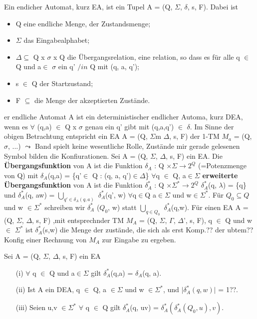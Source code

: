 Ein endicher Automat, kurz EA, ist ein Tupel A = (Q, $\Sigma$, $\delta$, s, F). Dabei ist 
\begin{itemize}
    \item Q eine endliche Menge, der Zustandsmenge;
    \item $\Sigma$ das Eingabealphabet;
    \item $\Delta \subseteq$ Q x $\sigma$ x Q die Übergangsrelation, eine relation, so dass es für alle q $\in$ Q und a$\in$ $\sigma$ ein q' $/in$ Q mit (q, a, q');
    \item s $\in$ Q der Startzustand;
    \item F $\subseteq$ die Menge der akzeptierten Zustände.
\end{itemize}
er endliche Automat A ist ein deterministischer endlicher Automa,
kurz DEA, wenn es $\forall$ (q,a) $\in$ Q x $\sigma$ genau ein q' gibt mit (q,a,q') $\in$ $\delta$. 
Im Sinne der obigen Betrachtung entspricht ein EA A = (Q, $\Sigma$m $\Delta$, s, F) der 1-TM $M_{a}$ = (Q, $\sigma$, ...)
$\leadsto $ Band spielt keine wesentliche Rolle, Zustände mir gerade gelesenen Symbol bilden die Konfiurationen.
Sei A = (Q, $\Sigma$, $\Delta$, s, F) ein EA. Die \textbf{Übergangsfunktion} von A ist die Funktion $\delta_{A}$ : Q $\times \Sigma\rightarrow 2^{Q}$ (=Potenzmenge von Q) mit $\delta_{A}$(q,a) = \{q'$\in$ Q : (q, a, q')$\in \Delta$\} $\forall$q $\in$ Q, a$\in \Sigma$ \textbf{erweiterte Übergangsfunktion} von A ist die Funktion $\delta_{A}^{*}$ : Q $\times \Sigma^{*} \rightarrow 2^{Q}$ $\delta_{A}^{*}$(q, $\lambda$) = \{q\} und $\delta_{A}^{*}$(q, aw) = $\bigcup \limits_{q'\in \delta_{A}(q,a)}$ $\delta_{A}^{*}$(q', w) $\forall$q$\in$Q a$\in \Sigma$ und w$\in \Sigma^{*}$. Für $Q_{0} \subseteq Q$ und w $\in \Sigma^{*}$ schreiben wir $\delta_{A}^{*}$ ($Q_{0}$, w) statt $\bigcup \limits_{q \in Q_{0}}$ $\delta_{A}^{*}$(q,w). Für einen EA A = (Q, $\Sigma$, $\Delta$, s, F) ,mit entsprechnder TM $M_{A}$ = (Q, $\Sigma$, $\Gamma$, $\Delta$', s, F), q $\in$ Q und w $\in$ $\Sigma^{*}$ ist $\delta_{A}^{*}$(s,w) die Menge der zustände, die sich als erst Komp.?? der ubtem?? Konfig einer Rechnung von $M_{A}$ zur Eingabe zu ergeben.

Sei A = (Q, $\Sigma$, $\Delta$, s, F) ein EA
\begin{itemize}
    \item [(i)] $\forall$ q $\in$ Q und a$\in \Sigma$ gilt $\delta_{A}^{*}$(q,a) = $\delta_{A}$(q, a).
    \item [(ii)] Ist A ein DEA, q $\in$ Q, a $\in \Sigma$ und w $\in \Sigma^{*}$, und $\lvert \delta_{A}^{*}(q,w) \rvert$ = 1??.
    \item[(iii)] Seien u,v $\in \Sigma^{*}$ $\forall$ q $\in$ Q gilt $\delta_{A}^{*}$(q, uv) = $\delta_{A}^{*}(\delta_{A}^{*}(Q_{0}, u), v)$.
\end{itemize}

